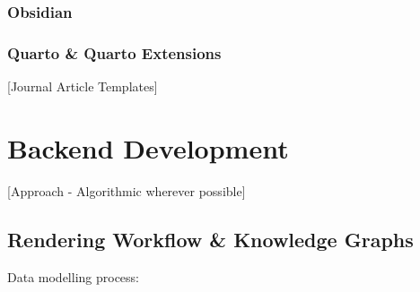 \documentclass[
  british,
]{article}
\begin{document}
\subsubsection{Obsidian}\label{obsidian}

\subsubsection{Quarto \& Quarto
Extensions}\label{quarto-quarto-extensions}

{[}Journal Article Templates{]}

\section{Backend Development}\label{backend-development}

{[}Approach - Algorithmic wherever possible{]}

\subsection{Rendering Workflow \& Knowledge
Graphs}\label{rendering-workflow-knowledge-graphs}

Data modelling process:
\end{document}
